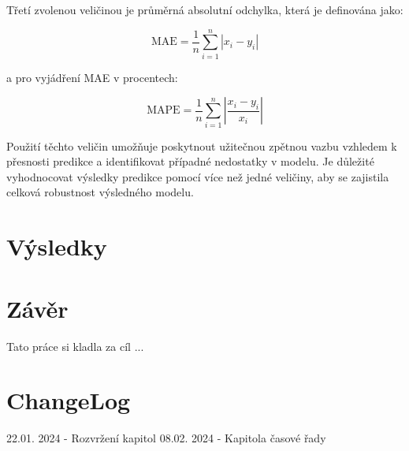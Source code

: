 \documentclass[FM,BP,fonts]{tulthesis}
\begin{document}
Třetí zvolenou veličinou je průměrná absolutní odchylka, která je definována jako:

\begin{equation}
	\text{MAE} = \frac{1}{n}\sum_{i=1}^{n}|x_i-y_i| 
\end{equation}

a pro vyjádření MAE v procentech: 

\begin{equation}
	\text{MAPE} = \frac{1}{n}\sum_{i=1}^{n}|\frac{x_i-y_i}{x_i}| 
\end{equation}

Použití těchto veličin umožňuje poskytnout užitečnou zpětnou vazbu vzhledem k přesnosti predikce a identifikovat případné nedostatky v modelu. Je důležité vyhodnocovat výsledky predikce pomocí více než jedné veličiny, aby se zajistila celková robustnost výsledného modelu.


\chapter{Výsledky}\label{Výsledky}

\chapter{Závěr}
Tato práce si kladla za cíl ... 

\chapter{ChangeLog}
22.01. 2024 - Rozvržení kapitol
08.02. 2024 - Kapitola časové řady
\end{document}
